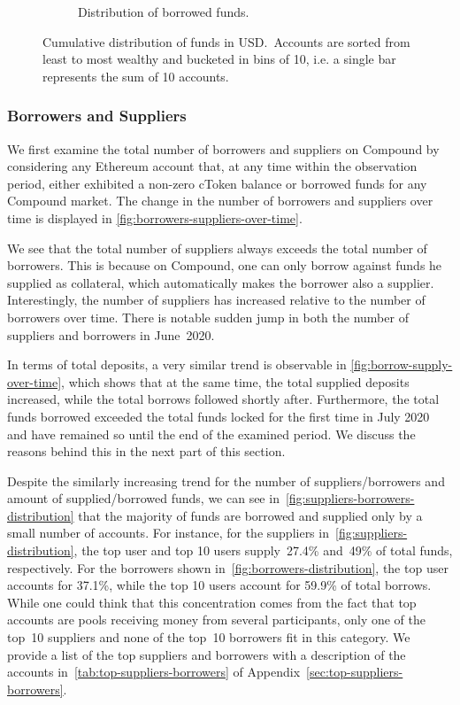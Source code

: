 \begin{figure}[tbp]
\begin{subfigure}{.5\textwidth}
    \caption{Distribution of borrowed funds.}
    \label{fig:borrowers-distribution}
  \end{subfigure}
  \caption{Cumulative distribution of funds in USD.~Accounts are sorted from least to most wealthy and bucketed in bins of 10, i.e. a single bar represents the sum of 10 accounts.}\label{fig:suppliers-borrowers-distribution}
\end{figure}


\subsubsection{Borrowers and Suppliers}
We first examine the total number of borrowers and suppliers on Compound by considering any Ethereum account that, at any time within the observation period, either exhibited a non-zero cToken balance or borrowed funds for any Compound market.
The change in the number of borrowers and suppliers over time is displayed in \autoref{fig:borrowers-suppliers-over-time}.

We see that the total number of suppliers always exceeds the total number of borrowers. 
This is because on Compound, one can only borrow against funds he supplied as collateral, which automatically makes the borrower also a supplier. 
Interestingly, the number of suppliers has increased relative to the number of borrowers over time. 
There is notable sudden jump in both the number of suppliers and borrowers in June~2020.

In terms of total deposits, a very similar trend is observable in \autoref{fig:borrow-supply-over-time}, which shows that at the same time, the total supplied deposits increased, while the total borrows followed shortly after.
Furthermore, the total funds borrowed exceeded the total funds locked for the first time in July 2020 and have remained so until the end of the examined period.
We discuss the reasons behind this in the next part of this section.

Despite the similarly increasing trend for the number of suppliers/borrowers and amount of supplied/borrowed funds, we can see in~\autoref{fig:suppliers-borrowers-distribution} that the majority of funds are borrowed and supplied only by a small number of accounts.
For instance, for the suppliers in~\autoref{fig:suppliers-distribution}, the top user and top 10 users supply~27.4\% and~49\% of total funds, respectively.
For the borrowers shown in~\autoref{fig:borrowers-distribution}, the top user accounts for 37.1\%, while the top 10 users account for 59.9\% of total borrows.
While one could think that this concentration comes from the fact that top accounts are pools receiving money from several participants, only one of the top~10 suppliers and none of the top~10 borrowers fit in this category.
We provide a list of the top suppliers and borrowers with a description of the accounts in~\autoref{tab:top-suppliers-borrowers} of Appendix~\ref{sec:top-suppliers-borrowers}.

